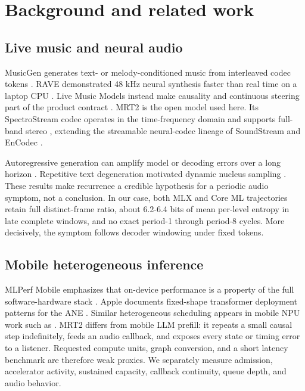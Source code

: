 \documentclass[10pt]{article}
\begin{document}
\section{Background and related work}
\subsection{Live music and neural audio}
MusicGen generates text- or melody-conditioned music from interleaved codec tokens \citep{musicgen}. RAVE demonstrated 48 kHz neural synthesis faster than real time on a laptop CPU \citep{rave}. Live Music Models instead make causality and continuous steering part of the product contract \citep{live-music-models}. MRT2 is the open model used here. Its SpectroStream codec operates in the time-frequency domain and supports full-band stereo \citep{spectrostream}, extending the streamable neural-codec lineage of SoundStream and EnCodec \citep{soundstream} \citep{encodec}.

Autoregressive generation can amplify model or decoding errors over a long horizon \citep{next-token-barrier}. Repetitive text degeneration motivated dynamic nucleus sampling \citep{neural-text-degeneration}. These results make recurrence a credible hypothesis for a periodic audio symptom, not a conclusion. In our case, both MLX and Core ML trajectories retain full distinct-frame ratio, about 6.2-6.4 bits of mean per-level entropy in late complete windows, and no exact period-1 through period-8 cycles. More decisively, the symptom follows decoder windowing under fixed tokens.

\subsection{Mobile heterogeneous inference}
MLPerf Mobile emphasizes that on-device performance is a property of the full software-hardware stack \citep{mlperf-mobile}. Apple documents fixed-shape transformer deployment patterns for the ANE \citep{apple-ane-transformers,coremltools}. Similar heterogeneous scheduling appears in mobile NPU work such as \texttt{} \citep{llm-npu}. MRT2 differs from mobile LLM prefill: it repeats a small causal step indefinitely, feeds an audio callback, and exposes every state or timing error to a listener. Requested compute units, graph conversion, and a short latency benchmark are therefore weak proxies. We separately measure admission, accelerator activity, sustained capacity, callback continuity, queue depth, and audio behavior.
\end{document}
